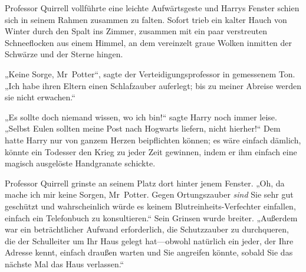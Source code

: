 Professor Quirrell vollführte eine leichte Aufwärtsgeste und Harrys Fenster schien sich in seinem Rahmen zusammen zu falten. Sofort trieb ein kalter Hauch von Winter durch den Spalt ins Zimmer, zusammen mit ein paar verstreuten Schneeflocken aus einem Himmel, an dem vereinzelt graue Wolken inmitten der Schwärze und der Sterne hingen.

„Keine Sorge, Mr~Potter“, sagte der Verteidigungsprofessor in gemessenem Ton. „Ich habe ihren Eltern einen Schlafzauber auferlegt; bis zu meiner Abreise werden sie nicht erwachen.“

„Es sollte doch niemand wissen, wo ich bin!“ sagte Harry noch immer leise. „Selbst Eulen sollten meine Post nach Hogwarts liefern, nicht hierher!“ Dem hatte Harry nur von ganzem Herzen beipflichten können; es wäre einfach dämlich, könnte ein Todesser den Krieg zu jeder Zeit gewinnen, indem er ihm einfach eine magisch ausgelöste Handgranate schickte.

Professor Quirrell grinste an seinem Platz dort hinter jenem Fenster. „Oh, da mache ich mir keine Sorgen, Mr~Potter. Gegen Ortungszauber \emph{sind} Sie sehr gut geschützt und wahrscheinlich würde es keinem Blutreinheits-Verfechter einfallen, einfach ein Telefonbuch zu konsultieren.“ Sein Grinsen wurde breiter. „Außerdem war ein beträchtlicher Aufwand erforderlich, die Schutzzauber zu durchqueren, die der Schulleiter um Ihr Haus gelegt hat—obwohl natürlich ein jeder, der Ihre Adresse kennt, einfach draußen warten und Sie angreifen könnte, sobald Sie das nächste Mal das Haus verlassen.“

